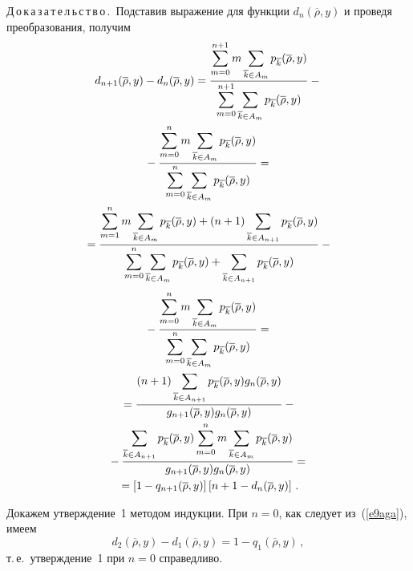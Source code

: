 \begin{multicols}{2}
Д\,о\,к\,а\,з\,а\,т\,е\,л\,ь\,с\,т\,в\,о\,.\ Подставив выражение для функции 
$d_n(\overline{\rho},y)$ и проведя преобразования, получим
\begin{multline*}
d_{n+1}(\overline{\rho},y) -d_n(\overline{\rho},y) = 
\displaystyle\frac{\displaystyle \sum\limits_{m=0}^{n+1}m\sum\limits_{\overline{k}\in A_m} 
p_{\overline{k}}(\overline{\rho},y)\mathstrut}{\displaystyle \sum\limits_{m=0}^{n+1}
\sum\limits_{\overline{k}\in A_m} p_{\overline{k}}(\overline{\rho},y)\mathstrut} - {}\\
{}-
\displaystyle\frac{\displaystyle \sum\limits_{m=0}^n m \sum\limits_{\overline{k}\in A_m} p_{\overline{k}} 
(\overline{\rho},y)\mathstrut}{\displaystyle \sum\limits_{m=0}^n
\sum\limits_{\overline{k}\in A_m}p_{\overline{k}}(\overline{\rho},y)\mathstrut}={}\\
{}=\displaystyle\frac{\displaystyle \sum\limits_{m=1}^n m \sum\limits_{\overline{k}\in 
A_m}p_{\overline{k}}(\overline{\rho},y)+(n+1)\sum\limits_{\overline{k}\in 
A_{n+1}}  p_{\overline{k}}(\overline{\rho},y)\mathstrut}{\displaystyle \sum\limits_{m=0}^n\sum\limits_{\overline{k
}\in A_m}p_{\overline{k}}(\overline{\rho},y)+\sum\limits_{\overline{k}\in 
A_{n+1}}p_{\overline{k}}(\overline{\rho},y)\mathstrut} -{}
\end{multline*}
\begin{multline}
{}-
\displaystyle\frac{\displaystyle \sum\limits_{m=0}^n m 
\sum\limits_{\overline{k}\in A_m}p_{\overline{k}}(\overline{\rho},y)\mathstrut}{\displaystyle \sum\limits_{m=0}^n\sum\limits_{\overline{k}\in A_m} 
p_{\overline{k}}(\overline{\rho},y)\mathstrut}={}\\
{}=\displaystyle\frac{\displaystyle (n+1)\sum\limits_{\overline{k}\in 
A_{n+1}}p_{\overline{k}}(\overline{\rho},y)g_n(\overline{\rho},y)\mathstrut}{\displaystyle g_{n+1}(\overline{\rho},y) g_n(\overline{\rho},y)\mathstrut} -{}\\
{}-
\displaystyle\frac{\displaystyle \sum\limits_{\overline{k}\in 
A_{n+1}}p_{\overline{k}}(\overline{\rho},y)\sum\limits_{m=0}^n  m 
\sum\limits_{\overline{k}\in A_m} p_{\overline{k}}(\overline{\rho},y) \mathstrut}{\displaystyle g_{n+1}(\overline{\rho},y) g_n(\overline{\rho},y)\mathstrut}
={}\\
{}=\left [ 1-q_{n+1}(\overline{\rho},y)\right ] \left [n+1-d_n(\overline{\rho},y)\right ]\,.
\label{e9aga}
\end{multline}


    Докажем утверждение~1 методом индукции. При $n = 0$, как следует 
из~(\ref{e9aga}), имеем
$$
d_2(\overline{\rho},y) - d_1 (\overline{\rho},y) =1-q_1(\overline{\rho},y)\,,
$$
    т.\,е.\ утверждение~1 при $n = 0$ справедливо. 


\end{multicols}
